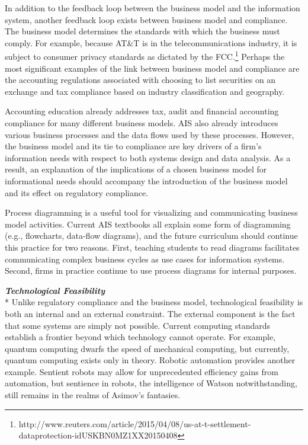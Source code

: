 \documentclass[12pt]{article}
\newcommand{\SubSubSection}[1]{{\centering{}\normalsize{}\textbf{\emph{#1}}}\\*\indent{}}
\begin{document}
In addition to the feedback loop between the business model and the information system, another feedback loop exists between business model and compliance. The business model determines the standards with which the business must comply. For example, because AT\&T is in the telecommunications industry, it is subject to consumer privacy standards as dictated by the FCC.\footnote{http://www.reuters.com/article/2015/04/08/us-at-t-settlement-dataprotection-idUSKBN0MZ1XX20150408} Perhaps the most significant examples of the link between business model and compliance are the accounting regulations associated with choosing to list securities on an exchange and tax compliance based on industry classification and geography.

Accounting education already addresses tax, audit and financial accounting compliance for many different business models. AIS also already introduces various business processes and the data flows used by these processes. However, the business model and its tie to compliance are key drivers of a firm's information needs with respect to both systems design and data analysis. As a result, an explanation of the implications of a chosen business model for informational needs should accompany the introduction of the business model and its effect on regulatory compliance.

Process diagramming is a useful tool for visualizing and communicating business model activities. Current AIS textbooks all explain some form of diagramming (e.g., flowcharts, data-flow diagrams), and the future curriculum should continue this practice for two reasons. First, teaching students to read diagrams facilitates communicating complex business cycles as use cases for information systems. Second, firms in practice continue to use process diagrams for internal purposes.

\SubSubSection{Technological Feasibility}
Unlike regulatory compliance and the business model, technological feasibility is both an internal and an external constraint. The external component is the fact that some systems are simply not possible. Current computing standards establish a frontier beyond which technology cannot operate. For example, quantum computing dwarfs the speed of mechanical computing, but currently, quantum computing exists only in theory. Robotic automation provides another example. Sentient robots may allow for unprecedented efficiency gains from automation, but sentience in robots, the intelligence of Watson notwithstanding, still remains in the realms of Asimov's fantasies.
\end{document}
